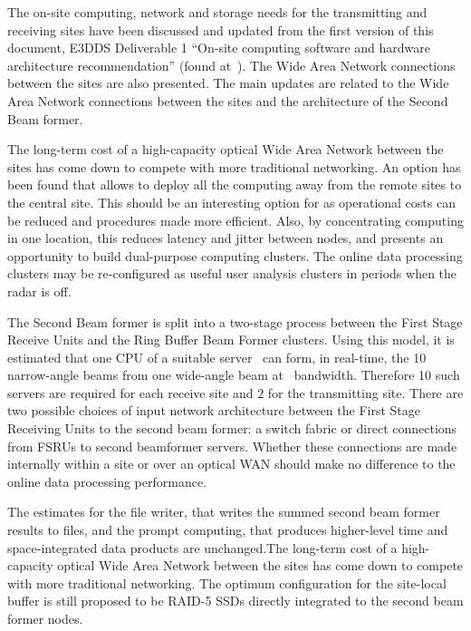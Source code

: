 \documentclass[12pt,a4paper]{article}
\newcommand{\tobedone}[2][1=]{\todo[inline,linecolor=red,backgroundcolor=red!25,bordercolor=red]{#2}}
\begin{document}

The on-site computing, network and storage needs for the \ED transmitting and receiving sites have been discussed and updated from the first version of this document, E3DDS Deliverable 1 ``On-site computing software and hardware architecture recommendation'' (found at~\cite{e3dds-do1}).
The Wide Area Network connections between the sites are also presented.
The main updates are related to the Wide Area Network connections between the sites and the architecture of the Second Beam former.

The long-term cost of a high-capacity optical Wide Area Network between the \ED sites has come down to compete with more traditional networking.
An option has been found that allows to deploy all the computing \einfra away from the remote sites to the central site.
This should be an interesting option for \ED as operational costs can be reduced and procedures made more efficient.
Also, by concentrating computing \einfra in one location, this reduces latency and jitter between nodes, and presents an opportunity to build dual-purpose computing clusters.
The online data processing clusters may be re-configured as useful user analysis clusters in periods when the radar is off.

The Second Beam former is split into a two-stage process between the First Stage Receive Units and the Ring Buffer Beam Former clusters.
Using this model, it is estimated that one CPU of a suitable server~\cite{amd-epyc} can form, in real-time, the 10 narrow-angle beams from one wide-angle beam at \NBW\ bandwidth.
Therefore 10 such servers are required for each receive site and 2 for the transmitting site.
There are two possible choices of input network architecture between the First Stage Receiving Units to the second beam former: a switch fabric or direct connections from FSRUs to second beamformer servers.
Whether these connections are made internally within a site or over an optical WAN should make no difference to the online data processing performance.

The estimates for the file writer, that writes the summed second beam former results to files, and the prompt computing, that produces higher-level time and space-integrated data products are unchanged.The long-term cost of a high-capacity optical Wide Area Network between the \ED sites has come down to compete with more traditional networking.
The optimum configuration for the site-local buffer is still proposed to be RAID-5 SSDs directly integrated to the second beam former nodes.
\end{document}
